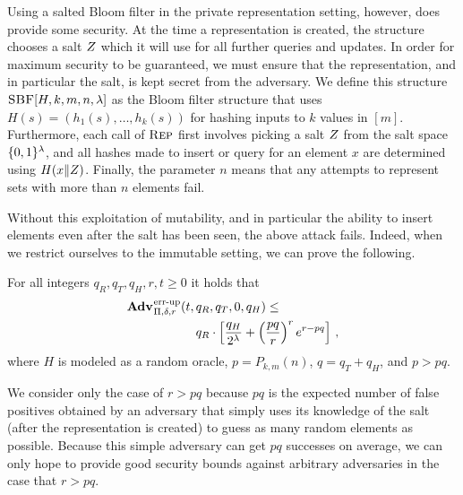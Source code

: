 {Using a salted Bloom filter in the private representation setting, however, does
provide some security. At the time a representation is created, the structure
chooses a salt $Z$ which it will use for all further queries and updates. In
order for maximum security to be guaranteed, we must ensure that the
representation, and in particular the salt, is kept secret from the adversary.
We define this structure $\textnormal{\textsc{SBF}}[H,k,m,n,\lambda]$ as the Bloom filter structure
that uses $H(s) = (h_1(s),\ldots,h_k(s))$ for hashing inputs to $k$ values in
$[m]$. Furthermore, each call of $\textnormal{\textsc{Rep}}$ first involves picking a salt $Z$
from the salt space $\{0,1\}^\lambda$, and all hashes made to insert or query for
an element $x$ are determined using $H(x \Vert Z)$. Finally, the parameter
$n$ means that any attempts to represent sets with more than $n$ elements fail.
}

Without this exploitation of mutability, and in particular the ability to insert
elements even after the salt has been seen, the above attack fails. Indeed, when
we restrict ourselves to the immutable setting, we can prove the following.
%
\begin{theorem}\label{thm:sbf-errep-immutable}
  For all integers $q_R, q_T, q_H, r, t \geq 0$ it holds that
  \begin{equation*}
    \begin{aligned}
            \Adv{\errep}_{\Pi,\delta,r}(t,\,&q_R,q_T,0,q_H) \leq \\
        & q_R \cdot \left[\frac{q_H}{2^\lambda} +
        \left(\frac{pq}{r}\right)^re^{r-pq}\right] \,,
    \end{aligned}
  \end{equation*}
  where $H$ is modeled as a random oracle, $p=P_{k,m}(n)$, $q = q_T + q_H$, and
  $p > pq$.
\end{theorem}
We consider only the case of $r > pq$ because $pq$ is the expected number of
false positives obtained by an adversary that simply uses its knowledge of the
salt (after the representation is created) to guess as many random elements as
possible. Because this simple adversary can get $pq$ successes on average, we
can only hope to provide good security bounds against arbitrary adversaries in
the case that $r > pq$.

